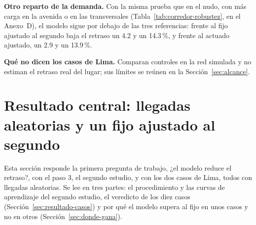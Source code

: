 \noindent\textbf{Otro reparto de la demanda.} Con la misma prueba que
en el nudo, con más carga en la avenida o en las transversales
(Tabla~\ref{tab:corredor-robustez}, en el Anexo~D), el modelo sigue por
debajo de las tres referencias: frente al fijo ajustado al segundo baja
el retraso un 4.2 y un 14.3\,\%, y frente al actuado ajustado, un 2.9 y
un 13.9\,\%.

\noindent\textbf{Qué no dicen los casos de Lima.} Comparan controles en
la red simulada y no estiman el retraso real del lugar; sus límites se
reúnen en la Sección~\ref{sec:alcance}.

\section{Resultado central: llegadas aleatorias y un fijo ajustado al segundo}
\label{sec:segundo-estudio}
\label{sec:resultado-central}
\label{sec:resultado-final}
\suppressfloats[t]

Esta sección responde la primera pregunta de trabajo, ¿el modelo reduce
el retraso?, con el paso 3, el segundo estudio, y con los dos casos de
Lima, todos con llegadas aleatorias. Se lee en tres partes: el
procedimiento y las curvas de aprendizaje del segundo estudio, el
veredicto de los diez casos (Sección~\ref{sec:resultado-casos}) y por
qué el modelo supera al fijo en unos casos y no en otros
(Sección~\ref{sec:donde-gana}).

